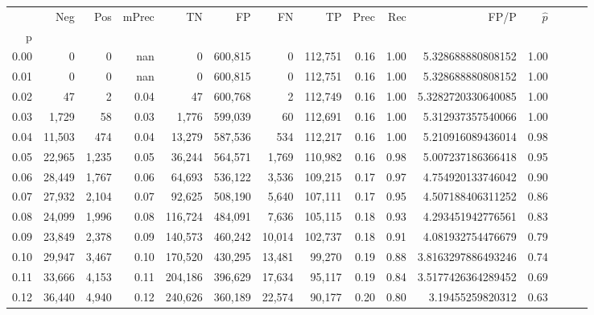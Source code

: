 \begin{tabular}{rrrrrrrrrrrrrrr}
\toprule
{} &     Neg &    Pos & mPrec &       TN &       FP &       FN &       TP &  Prec &   Rec &                    FP/P & $\hat{p}$ \\
p    &         &        &       &          &          &          &          &       &       &                         &           \\
\midrule
0.00 &       0 &      0 &   nan &        0 &  600,815 &        0 &  112,751 &  0.16 &  1.00 &       5.328688880808152 &      1.00 \\
0.01 &       0 &      0 &   nan &        0 &  600,815 &        0 &  112,751 &  0.16 &  1.00 &       5.328688880808152 &      1.00 \\
0.02 &      47 &      2 &  0.04 &       47 &  600,768 &        2 &  112,749 &  0.16 &  1.00 &      5.3282720330640085 &      1.00 \\
0.03 &   1,729 &     58 &  0.03 &    1,776 &  599,039 &       60 &  112,691 &  0.16 &  1.00 &       5.312937357540066 &      1.00 \\
0.04 &  11,503 &    474 &  0.04 &   13,279 &  587,536 &      534 &  112,217 &  0.16 &  1.00 &       5.210916089436014 &      0.98 \\
0.05 &  22,965 &  1,235 &  0.05 &   36,244 &  564,571 &    1,769 &  110,982 &  0.16 &  0.98 &       5.007237186366418 &      0.95 \\
0.06 &  28,449 &  1,767 &  0.06 &   64,693 &  536,122 &    3,536 &  109,215 &  0.17 &  0.97 &       4.754920133746042 &      0.90 \\
0.07 &  27,932 &  2,104 &  0.07 &   92,625 &  508,190 &    5,640 &  107,111 &  0.17 &  0.95 &       4.507188406311252 &      0.86 \\
0.08 &  24,099 &  1,996 &  0.08 &  116,724 &  484,091 &    7,636 &  105,115 &  0.18 &  0.93 &       4.293451942776561 &      0.83 \\
0.09 &  23,849 &  2,378 &  0.09 &  140,573 &  460,242 &   10,014 &  102,737 &  0.18 &  0.91 &       4.081932754476679 &      0.79 \\
0.10 &  29,947 &  3,467 &  0.10 &  170,520 &  430,295 &   13,481 &   99,270 &  0.19 &  0.88 &      3.8163297886493246 &      0.74 \\
0.11 &  33,666 &  4,153 &  0.11 &  204,186 &  396,629 &   17,634 &   95,117 &  0.19 &  0.84 &      3.5177426364289452 &      0.69 \\
0.12 &  36,440 &  4,940 &  0.12 &  240,626 &  360,189 &   22,574 &   90,177 &  0.20 &  0.80 &        3.19455259820312 &      0.63 \\

\end{tabular}
